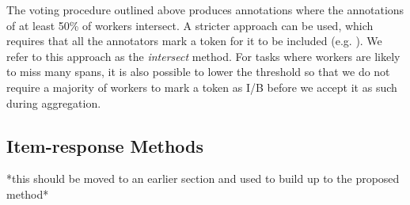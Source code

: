 The voting procedure outlined above produces annotations where the annotations of at least 50\% of workers intersect. A stricter approach can be used, which requires that all the annotators mark a token for it to be included (e.g. \cite{farra2015annotating}). We refer to this approach as the \emph{intersect} method. For tasks where workers are likely to miss many spans, it is also possible to lower the threshold so that we do not require a majority of workers to mark a token as I/B before we accept it as such during aggregation.

% 
% 
% 

\subsection{Item-response Methods}

*this should be moved to an earlier section and used to build up to the proposed method*

